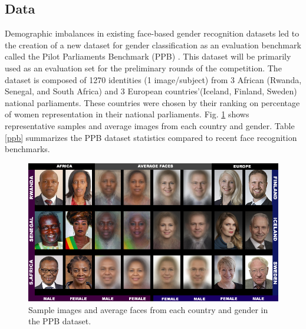 \documentclass[11pt, oneside]{article}
\makeatletter
\let\@internalcite\cite
\def\cite{\def\citeauthoryear##1##2{##1, ##2}\@internalcite}
\makeatother
\begin{document}
\subsection{Data}

Demographic imbalances in existing face-based gender recognition datasets led 
to the creation of a new dataset for gender classification as an evaluation 
benchmark  called the Pilot Parliaments Benchmark (PPB) 
\cite{buolamwini2018gender}. This dataset will be primarily used as an 
evaluation set for the preliminary rounds of the competition. The dataset is 
composed of 1270 identities (1 image/subject) from 3 African (Rwanda, Senegal, 
and South Africa) and 3 European countries'(Iceland, Finland, Sweden) national 
parliaments. These countries were chosen by their ranking on percentage of 
women representation in their national parliaments. Fig. \ref{fig_ppb} shows 
representative samples and average images from each country and gender. Table 
\ref{ppb} summarizes the PPB dataset statistics compared to recent face 
recognition benchmarks.

\begin{figure}[t]
    \label{fig_ppb}
    \centering
    \includegraphics[width=140mm]{fig/ppb}
    \caption{Sample images and average faces from each country and gender in 
    	the PPB dataset.}
\end{figure}
\end{document}
